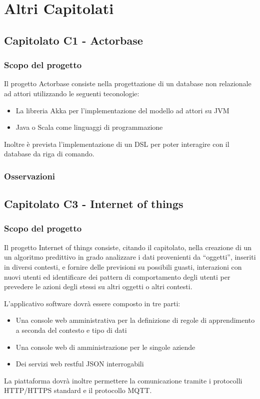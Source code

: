 \section{Altri Capitolati}

\subsection{Capitolato C1 - Actorbase}
\subsubsection{Scopo del progetto}

Il progetto Actorbase consiste nella progettazione di un database non relazionale ad attori utilizzando le seguenti teconologie:
\begin{itemize}
	\item La libreria Akka per l'implementazione del modello ad attori su JVM
	\item Java o Scala come linguaggi di programmazione
\end{itemize}
Inoltre è prevista l'implementazione di un DSL per poter interagire con il database da riga di comando.

\subsubsection{Osservazioni}



\subsection{Capitolato C3 - Internet of things}
\subsubsection{Scopo del progetto}

Il progetto Internet of things consiste, citando il capitolato, nella creazione di un un algoritmo predittivo in grado analizzare i dati provenienti da “oggetti”, inseriti
in diversi contesti, e fornire delle previsioni su possibili guasti, interazioni con nuovi utenti ed identificare dei pattern di comportamento degli utenti per prevedere le azioni degli
stessi su altri oggetti o altri contesti.

L'applicativo software dovrà essere composto in tre parti:
\begin{itemize}
	\item Una console web amministrativa per la definizione di regole di apprendimento a seconda del contesto e tipo di dati
	\item Una console web di amministrazione per le singole aziende
	\item Dei servizi web restful JSON interrogabili
\end{itemize}
La piattaforma dovrà inoltre permettere la comunicazione tramite i protocolli HTTP/HTTPS standard e il protocollo MQTT.


